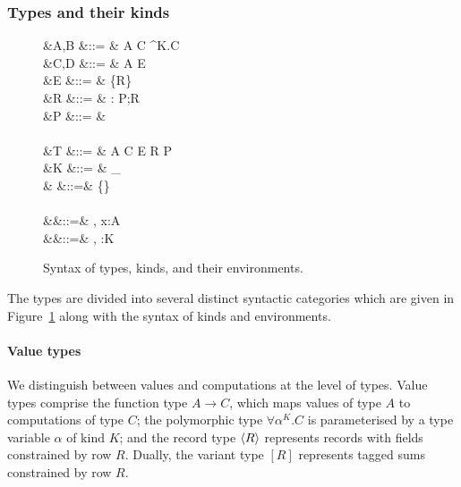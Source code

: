 \documentclass[12pt,phd,lfcs,twoside,openright,logo,leftchapter,normalheadings]{infthesis}
\theoremstyle{plain}
\theoremstyle{definition}
\begin{document}
\subsubsection{Types and their kinds}
\label{sec:base-language-types}
%
\begin{figure}
\begin{syntax}
    &A,B \in \ValTypeCat  &::= & A \to C
                             \mid  \forall \alpha^K.C
                             \mid   {} \mid [R]
                             \mid  \alpha \\
                      &C,D \in \CompTypeCat   &::= & A \eff E \\
   &E \in \EffectCat   &::= & \{R\}\\
      &R \in \RowCat      &::= & \ell : P;R \mid \rho \mid \cdot \\
 &P \in \PresenceCat  &::= &  \mid \Abs \mid \theta\\
\\
          &T \in \TypeCat    &::= & A \mid C \mid E \mid R \mid P \\
          &K \in \KindCat    &::= & \Type \mid \Comp \mid \Effect \mid \Row_ \mid \Presence \\
     & \in \LabelCat &::=& \emptyset \mid \{\ell\} \uplus {}\\\\

 &\Gamma \in \TyEnvCat   &::=& \cdot \mid \Gamma, x:A \\
 &\Delta \in \KindEnvCat &::=& \cdot \mid \Delta, \alpha:K \\
\end{syntax}
  \caption{Syntax of types, kinds, and their environments.}
  \label{fig:base-language-types}
\end{figure}
%
The types are divided into several distinct syntactic categories which
are given in Figure~\ref{fig:base-language-types} along with the
syntax of kinds and environments.
%
\paragraph{Value types}
We distinguish between values and computations at the level of
types. Value types comprise the function type $A \to C$, which maps
values of type $A$ to computations of type $C$; the polymorphic type
$\forall \alpha^K . C$ is parameterised by a type variable $\alpha$ of
kind $K$; and the record type $\langle R \rangle$ represents records with
fields constrained by row $R$. Dually, the variant type $[R]$
represents tagged sums constrained by row $R$.
\end{document}

